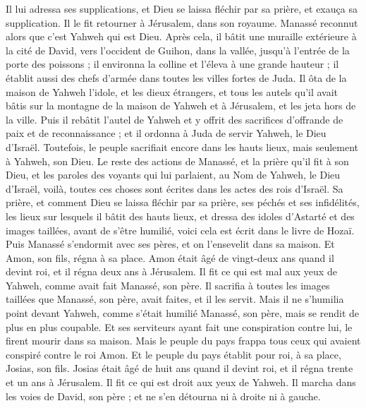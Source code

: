\begin{multicols}{2}
Il lui adressa ses supplications, et Dieu se laissa fléchir par sa prière, et exauça sa supplication. Il le fit retourner à Jérusalem, dans son royaume. Manassé reconnut alors que c'est Yahweh qui est Dieu.
Après cela, il bâtit une muraille extérieure à la cité de David, vers l'occident de Guihon, dans la vallée, jusqu'à l'entrée de la porte des poissons ; il environna la colline et l'éleva à une grande hauteur ; il établit aussi des chefs d'armée dans toutes les villes fortes de Juda.
Il ôta de la maison de Yahweh l'idole, et les dieux étrangers, et tous les autels qu'il avait bâtis sur la montagne de la maison de Yahweh et à Jérusalem, et les jeta hors de la ville.
Puis il rebâtit l'autel de Yahweh et y offrit des sacrifices d'offrande de paix et de reconnaissance ; et il ordonna à Juda de servir Yahweh, le Dieu d'Israël.
Toutefois, le peuple sacrifiait encore dans les hauts lieux, mais seulement à Yahweh, son Dieu.
Le reste des actions de Manassé, et la prière qu'il fit à son Dieu, et les paroles des voyants qui lui parlaient, au Nom de Yahweh, le Dieu d'Israël, voilà, toutes ces choses sont écrites dans les actes des rois d'Israël.
Sa prière, et comment Dieu se laissa fléchir par sa prière, ses péchés et ses infidélités, les lieux sur lesquels il bâtit des hauts lieux, et dressa des idoles d'Astarté et des images taillées, avant de s'être humilié, voici cela est écrit dans le livre de Hozaï.
Puis Manassé s'endormit avec ses pères, et on l'ensevelit dans sa maison. Et Amon, son fils, régna à sa place.
Amon était âgé de vingt-deux ans quand il devint roi, et il régna deux ans à Jérusalem.
Il fit ce qui est mal aux yeux de Yahweh, comme avait fait Manassé, son père. Il sacrifia à toutes les images taillées que Manassé, son père, avait faites, et il les servit.
Mais il ne s'humilia point devant Yahweh, comme s'était humilié Manassé, son père, mais se rendit de plus en plus coupable.
Et ses serviteurs ayant fait une conspiration contre lui, le firent mourir dans sa maison.
Mais le peuple du pays frappa tous ceux qui avaient conspiré contre le roi Amon. Et le peuple du pays établit pour roi, à sa place, Josias, son fils.
\VerseOne{}Josias était âgé de huit ans quand il devint roi, et il régna trente et un ans à Jérusalem.
Il fit ce qui est droit aux yeux de Yahweh. Il marcha dans les voies de David, son père ; et ne s'en détourna ni à droite ni à gauche.

\end{multicols}

